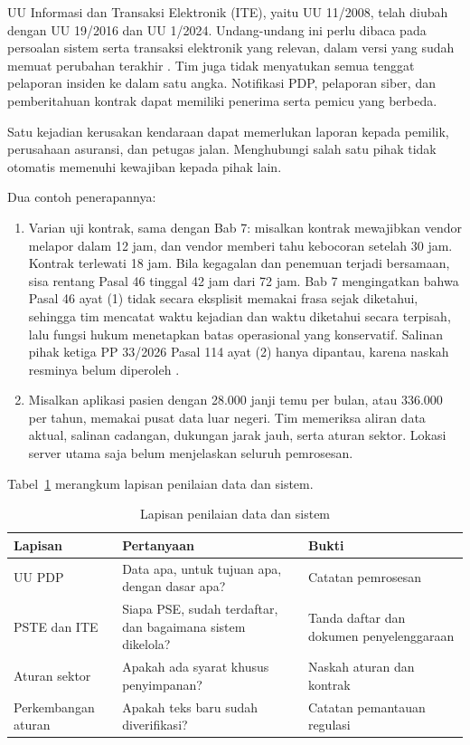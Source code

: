 UU Informasi dan Transaksi Elektronik (ITE), yaitu UU 11/2008, telah diubah dengan UU 19/2016
dan UU 1/2024. Undang-undang ini perlu dibaca pada persoalan sistem serta transaksi elektronik
yang relevan, dalam versi yang sudah memuat perubahan terakhir \cite{c03-uu1-2024}. Tim juga
tidak menyatukan semua tenggat pelaporan insiden ke dalam satu angka. Notifikasi PDP, pelaporan
siber, dan pemberitahuan kontrak dapat memiliki penerima serta pemicu yang berbeda.

Satu kejadian kerusakan kendaraan dapat memerlukan laporan kepada pemilik, perusahaan asuransi,
dan petugas jalan. Menghubungi salah satu pihak tidak otomatis memenuhi kewajiban kepada pihak
lain.

Dua contoh penerapannya:
\begin{enumerate}
  \item Varian uji kontrak, sama dengan Bab 7: misalkan kontrak mewajibkan vendor melapor dalam
  12 jam, dan vendor memberi tahu kebocoran setelah 30 jam. Kontrak terlewati 18 jam. Bila
  kegagalan dan penemuan terjadi bersamaan, sisa rentang Pasal 46 tinggal 42 jam dari 72 jam. Bab 7
  mengingatkan bahwa Pasal 46 ayat (1) tidak secara eksplisit memakai frasa sejak diketahui,
  sehingga tim mencatat waktu kejadian dan waktu diketahui secara terpisah, lalu fungsi hukum
  menetapkan batas operasional yang konservatif. Salinan pihak ketiga PP 33/2026 Pasal 114 ayat (2)
  hanya dipantau, karena naskah resminya belum diperoleh \cite{c03-pp33-nonresmi}.
  \item Misalkan aplikasi pasien dengan 28.000 janji temu per bulan, atau 336.000 per tahun,
  memakai pusat data luar negeri. Tim memeriksa aliran data aktual, salinan cadangan, dukungan
  jarak jauh, serta aturan sektor. Lokasi server utama saja belum menjelaskan seluruh
  pemrosesan.
\end{enumerate}

Tabel~\ref{tab:ch03-pdp} merangkum lapisan penilaian data dan sistem.

\begin{table}[!htb]
  \centering\small
  \caption{Lapisan penilaian data dan sistem}\label{tab:ch03-pdp}
  \begin{tabularx}{\textwidth}{|>{\raggedright\arraybackslash}p{}|>{\raggedright\arraybackslash}X|>{\raggedright\arraybackslash}X|}
    \hline
    \textbf{Lapisan} & \textbf{Pertanyaan} & \textbf{Bukti} \\ \hline
    UU PDP & Data apa, untuk tujuan apa, dengan dasar apa? & Catatan pemrosesan \\ \hline
    PSTE dan ITE & Siapa PSE, sudah terdaftar, dan bagaimana sistem dikelola? & Tanda daftar dan
    dokumen penyelenggaraan \\ \hline
    Aturan sektor & Apakah ada syarat khusus penyimpanan? & Naskah aturan dan kontrak \\ \hline
    Perkembangan aturan & Apakah teks baru sudah diverifikasi? & Catatan pemantauan regulasi \\
    \hline
  \end{tabularx}
\end{table}

